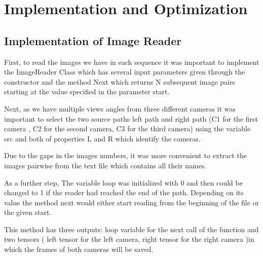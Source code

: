 \section{Implementation and Optimization}
\subsection{Implementation of Image Reader}
\label{subsec:Implementation of Image Reader}

First, to read the images we have in each sequence it was important to implement the ImageReader Class which has several input parameters given through the constructor and the method Next which returns N subsequent image pairs starting at the value specified in the parameter start.

Next, as we have multiple views angles from three different cameras it was important to select the two source paths left path and right path (C1 for the first camera , C2 for the second camera, C3 for the third camera) using the variable src and both of properties L and R which identify the cameras. 

Due to the gaps in the images numbers, it was more convenient to extract the images pairwise from the text file which contains all their names. 

As a further step, The variable loop was initialized with 0 and then could be changed to 1 if the reader had reached the end of the path. Depending on its value the method next would either start reading from the beginning of the file or the given start.

This method has three outputs: loop variable for the next call of the function and two tensors ( left tensor for the left camera, right tensor for the right camera )in which the frames of both cameras will be saved.
